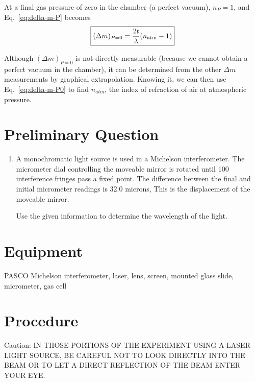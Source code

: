 At a final gas pressure of zero in the chamber (a perfect vacuum), 
$n_P = 1$, and Eq.~\ref{eq:delta-m-P} becomes
\begin{equation}
\boxed{ (\Delta m)_{P=0} = \frac{2t}{\lambda}(n_{\rm atm} - 1)}
\label{eq:delta-m-P0}
\end{equation}

Although $(\Delta m)_{P=0}$ is not directly measurable (because 
we cannot obtain a perfect vacuum in the chamber), it can be 
determined from the other $\Delta m$ measurements by graphical 
extrapolation. Knowing it, we can then use Eq.~\ref{eq:delta-m-P0} to find $n_{atm}$, 
the index of refraction of air at atmospheric pressure.



\section{Preliminary Question}

\begin{enumerate}
\item A monochromatic light source is used in a Michelson interferometer. 
The micrometer dial controlling the moveable mirror is rotated 
until 100 interference fringes pass a fixed point. The difference 
between the final and initial micrometer readings is 32.0 microns, 
This is the displacement of the moveable mirror. 

Use the given information to determine the wavelength of the 
light. 

\end{enumerate}


\section{Equipment}
PASCO Michelson interferometer, laser, lens, screen, 
mounted glass slide, micrometer, gas cell


 \section{Procedure}

Caution: IN THOSE PORTIONS OF THE EXPERIMENT USING A LASER LIGHT 
SOURCE, BE CAREFUL NOT TO LOOK DIRECTLY INTO THE BEAM OR TO LET 
A DIRECT REFLECTION OF THE BEAM ENTER YOUR EYE.


